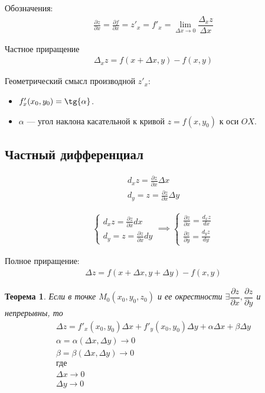 \documentclass[a4paper,12pt,oneside]{extbook}
\theoremstyle{numbered}
\theoremstyle{unnumbered}
\theoremstyle{named}
\newtheorem{theorem}{Теорема}[section]
\theoremstyle{unnumbered}
\theoremstyle{named}
\theoremstyle{named}
\theoremstyle{named}
\begin{document}
Обозначения:
\begin{gather*}
    \frac{\partial z}{\partial x} = \frac{\partial f}{\partial x} = z'_x = f'_x = \lim_{\Delta x \to 0}{\dfrac{\Delta_x z}{\Delta x}}
\end{gather*}

Частное приращение
\begin{gather*}
    \Delta_x z = f(x + \Delta x, y) - f(x, y)
\end{gather*}

Геометрический смысл производной \(z'_x\):
\begin{itemize}
    \item {\(f'_x(x_0, y_0) = \tg{\alpha}\).}
    \item {\(\alpha\) — угол наклона касательной к кривой \(z = f(x, y_0)\) к оси \(OX\).}
\end{itemize}


\subsection{Частный дифференциал}%
\label{sub:Частный дифференциал}

\begin{gather*}
    d_x z = \frac{\partial z}{\partial x} \Delta x \\
    d_y = z = \frac{\partial z}{\partial x} \Delta y
\end{gather*}

\begin{gather*}
    \begin{cases}
        d_x z = \frac{\partial z}{\partial x} dx \\
        d_y = z = \frac{\partial z}{\partial x} dy
    \end{cases}
    \implies
    \begin{cases}
        \frac{\partial z}{\partial x} = \frac{d_x z}{dx} \\
        \frac{\partial z}{\partial y} = \frac{d_y z}{dy}
    \end{cases}
\end{gather*}

Полное приращение:
\begin{gather*}
    \Delta z = f(x + \Delta x, y + \Delta y) - f(x, y)
\end{gather*}

\begin{theorem}
    Если в точке \(M_0(x_0, y_0, z_0)\) и ее окрестности \(\exists \dfrac{\partial z}{\partial x}, \dfrac{\partial z}{\partial y}\) и непрерывны, то
    \begin{gather*}
        \Delta z = f'_x(x_0, y_0) \Delta x + f'_y(x_0, y_0) \Delta y + \alpha \Delta x + \beta \Delta y \\
        \alpha = \alpha(\Delta x, \Delta y) \to 0 \\
        \beta = \beta(\Delta x, \Delta y) \to 0 \\
        \text{где} \\
        \Delta x \to 0 \\
        \Delta y \to 0
    \end{gather*}
\end{theorem}
\end{document}
